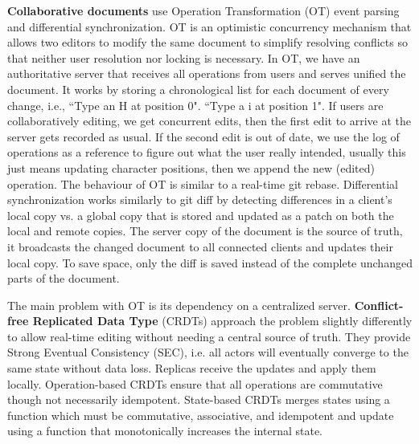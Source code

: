 \documentclass{article}
\begin{document}
    \textbf{Collaborative documents} use Operation Transformation (OT) event parsing and differential synchronization. OT is an optimistic concurrency mechanism that allows two editors to modify the same document to simplify resolving conflicts so that neither user resolution nor locking is necessary. In OT, we have an authoritative server that receives all operations from users and serves unified the document. It works by storing a chronological list for each document of every change, i.e., ``Type an H at position 0". ``Type a i at position 1". If users are collaboratively editing, we get concurrent edits, then the first edit to arrive at the server gets recorded as usual. If the second edit is out of date, we use the log of operations as a reference to figure out what the user really intended, usually this just means updating character positions, then we append the new (edited) operation. The behaviour of OT is similar to a real-time git rebase. Differential synchronization works similarly to git diff by detecting differences in a client's local copy vs. a global copy that is stored and updated as a patch on both the local and remote copies. The server copy of the document is the source of truth, it broadcasts the changed document to all connected clients and updates their local copy. To save space, only the diff is saved instead of the complete unchanged parts of the document.
    
    The main problem with OT is its dependency on a centralized server. \textbf{Conflict-free Replicated Data Type} (CRDTs) approach the problem slightly differently to allow real-time editing without needing a central source of truth. They provide Strong Eventual Consistency (SEC), i.e. all actors will eventually converge to the same state without data loss. Replicas receive the updates and apply them locally. Operation-based CRDTs ensure that all operations are commutative though not necessarily idempotent. State-based CRDTs merges states using a function which must be commutative, associative, and idempotent and update using a function that monotonically increases the internal state.
    
\end{document}
